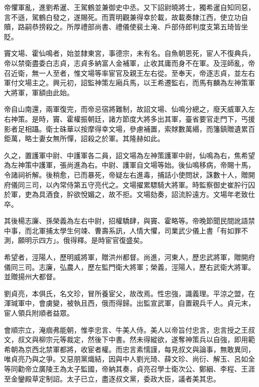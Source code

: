 \begin{pinyinscope}
 帝懼軍亂，進劉希暹、王駕鶴並兼御史中丞。又下詔尉曉將士，獨希暹自知同惡，言不遜，駕鶴白發之，遂賜死。而賈明觀兼得幸於載，故載奏隸江西，使立功自贖，路嗣恭搒殺之。所厚禮部尚書、禮儀使裴土淹、戶部侍郎判度支第五琦皆坐貶。



 竇文場、霍仙鳴者，始並隸東宮，事德宗，未有名。自魚朝恩死，宦人不復典兵，帝以禁衛盡委白志貞，志貞多納富人金補軍，止收其庸而身不在軍。及涇師亂，帝召近衛，無一人至者，惟文場等率宦官及親王左右從。至奉天，帝逐志貞，並左右軍付文場主之。興元初，詔監神策左廂兵馬，以王希遷監右，而馬有麟為左神策軍大將軍，軍額由此始。



 帝自山南還，兩軍復完，而帝忌宿將難制，故詔文場、仙鳴分總之，廢天威軍入左右神策。是時，竇、霍權振朝廷，諸方節度大將多出其軍，臺省要官走門下，丐援影者足相躡。衛士硃華以按摩得幸文場，參慮補置，索賕數萬緡，而籓鎮贈遺累百鉅萬，略士妻女無所憚，詔殺之於軍。其隆赫如此。



 久之，置護軍中尉、中護軍各二員，詔文場為左神策護軍中尉，仙鳴為右，焦希望為左神策中護軍，張尚進為右。中尉、護軍自文場等始。後仙鳴移病，帝賜十馬，令諸祠祈解。後稍愈，已而暴死，帝疑左右進毒，捕詰小使問狀，誅數十人，贈開府儀同三司，以內常侍第五守亮代之。文場擢累驃騎大將軍。時監察御史崔肸行囚於軍，吏為具酒食，肸欲悅媚之，故不拒。文場劾奏，詔流肸遠方。文場年老致仕卒。



 其後楊志廉、孫榮義為左右中尉，招權驕肆，與竇、霍略等。帝晚節聞民間訛語禁中事，而北軍捕太學生何竦、曹壽系訊，人情大懼，司業武少儀上書「有如罪不測，願明示四方」。俄得釋。是時宦官復盛矣。



 希望者，涇陽人，歷明威將軍，贈洪州都督。尚進，河東人，歷忠武將軍，贈開府儀同三司。志廉，弘農人，歷左監門衛大將軍；榮義，涇陽人，歷右武衛大將軍。並贈揚州大都督。



 劉貞亮，本俱氏，名文珍，冒所養宦父，故改焉。性忠強，識義理。平涼之盟，在渾瑊軍中，會虜變，被執且西，俄而得歸。出監宣武軍，自置親兵千人。貞元末，宦人領兵附順者益眾。



 會順宗立，淹痼弗能朝，惟李忠言、牛美人侍。美人以帝旨付忠言，忠言授之王叔文，叔文與柳宗元等裁定，然後下中書。然未得縱欲，遂奪神策兵以自強，即用範希朝為京西北禁軍都將，收宦者權。而忠言素懦謹，每見叔文與論事，無敢異同，唯貞亮乃與之爭。又惡朋黨熾結，因與中人劉光琦、薛文珍、尚衍、解玉、呂如全等同勸帝立廣陵王為太子監國，帝納其奏，貞亮召學士衛次公、鄭絪、李程、王涯至金鑾殿草定制詔。太子已立，盡逐叔文黨，委政大臣，議者美其忠。




\end{pinyinscope}
